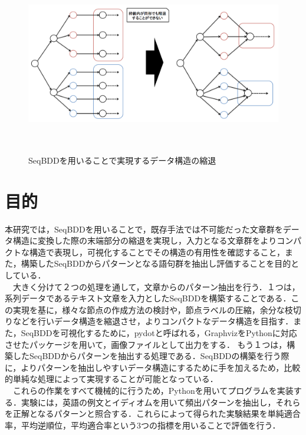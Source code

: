 \documentclass[12pt,twoside, fleqn]{ujbook}
\begin{document}
	\begin{figure}[htbp]
	\begin{center}
		\includegraphics [clip, height=8cm]{./img/syukutai.png}
		\caption{SeqBDDを用いることで実現するデータ構造の縮退}
		\label{fig:syukutai}
	\end{center}
	\end{figure}



\section{目的}
本研究では，SeqBDDを用いることで，既存手法では不可能だった文章群をデータ構造に変換した際の末端部分の縮退を実現し，入力となる文章群をよりコンパクトな構造で表現し，可視化することでその構造の有用性を確認すること，また，構築したSeqBDDからパターンとなる語句群を抽出し評価することを目的としている．\\
　大きく分けて２つの処理を通して，文章からのパターン抽出を行う．１つは，系列データであるテキスト文章を入力としたSeqBDDを構築することである．この実現を基に，様々な節点の作成方法の検討や，節点ラベルの圧縮，余分な枝切りなどを行いデータ構造を縮退させ，よりコンパクトなデータ構造を目指す．また，SeqBDDを可視化するために，pydotと呼ばれる，GraphvizをPythonに対応させたパッケージを用いて，画像ファイルとして出力をする．
もう１つは，構築したSeqBDDからパターンを抽出する処理である．SeqBDDの構築を行う際に，よりパターンを抽出しやすいデータ構造にするために手を加えるため，比較的単純な処理によって実現することが可能となっている．\\
　これらの作業をすべて機械的に行うため，Pythonを用いてプログラムを実装する．実験には，英語の例文とイディオムを用いて頻出パターンを抽出し，それらを正解となるパターンと照合する．これらによって得られた実験結果を単純適合率，平均逆順位，平均適合率という3つの指標を用いることで評価を行う．
\end{document}
